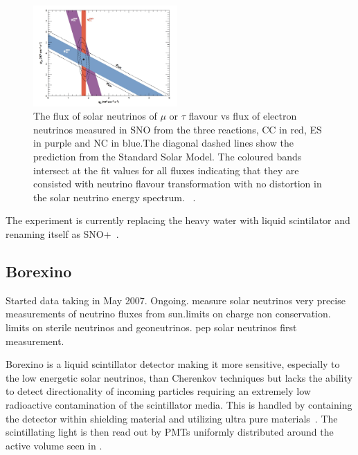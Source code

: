 \begin{figure}[h!]
\centering
  \centering
\includegraphics[width=0.49\textwidth]{figures/snoSpec.jpeg}
\vspace{2mm}
\caption{The flux of solar neutrinos of $\mu$ or $\tau$ flavour vs flux of electron neutrinos measured in SNO from the three reactions, CC in red, ES in purple and NC in blue.The diagonal dashed lines show the prediction from the Standard Solar Model. The coloured bands intersect at the fit values for all fluxes indicating that they are consisted with neutrino flavour transformation with no distortion in the solar neutrino energy spectrum. ~\cite{Fix6}.}
\label{fig:SNO2}
\end{figure}

The experiment is currently replacing the heavy water with liquid scintilator and renaming itself as SNO+~\cite{42SNO+}.

\subsection{Borexino}
Started data taking in May 2007. Ongoing. measure solar neutrinos very precise measurements of neutrino fluxes from sun.limits on charge non conservation. limits on sterile neutrinos and geoneutrinos. pep solar neutrinos first measurement.

Borexino is a liquid scintillator detector making it more sensitive, especially to the low energetic solar neutrinos, than Cherenkov techniques but lacks the ability to detect directionality of incoming particles requiring an extremely low radioactive contamination of the scintillator media. This is handled by containing the detector within shielding material and utilizing ultra pure materials~\cite{63Borexino}. The scintillating light is then read out by PMTs uniformly distributed around the active volume seen in .

